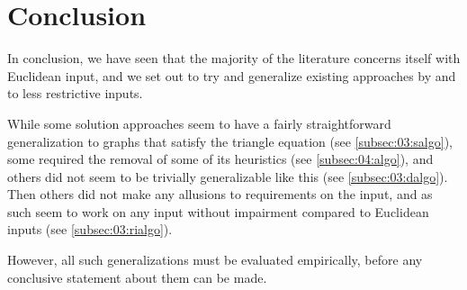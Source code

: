 \section{Conclusion}

In conclusion, we have seen that the majority of the literature concerns itself with Euclidean input,
and we set out to try and generalize existing approaches by \citeauthor{tsiligiridis_heuristic_1984} and \citeauthor{szwarc_novel_2022} to less restrictive inputs. 

While some solution approaches seem to have a fairly straightforward generalization to graphs that satisfy the triangle equation (see \cref{subsec:03:salgo}),
some required the removal of some of its heuristics (see \cref{subsec:04:algo}),
and others did not seem to be trivially generalizable like this (see \cref{subsec:03:dalgo}).
Then others did not make any allusions to requirements on the input, and as such seem to work on any input without impairment compared to Euclidean inputs (see \cref{subsec:03:rialgo}).

However, all such generalizations must be evaluated empirically, before any conclusive statement about them can be made.
